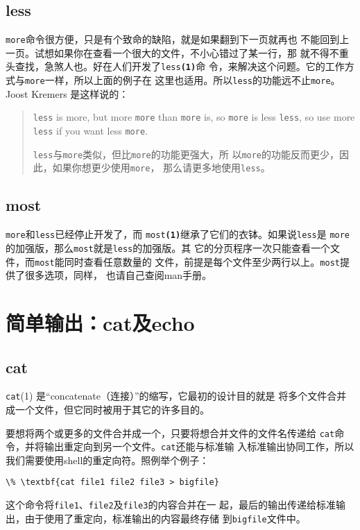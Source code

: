 \subsection{less}
\label{sec:handlingFilesAndDirectories:pagers:less}
\texttt{more}命令很方便，只是有个致命的缺陷，就是如果翻到下一页就再也
不能回到上一页。试想如果你在查看一个很大的文件，不小心错过了某一行，那
就不得不重头查找，急煞人也。好在人们开发了\texttt{less\textbf{(1)}}命
令，来解决这个问题。它的工作方式与\texttt{more}一样，所以上面的例子在
这里也适用。所以\texttt{less}的功能远不止\texttt{more}。Joost Kremers
是这样说的：
\begin{quote}
  \texttt{less} is more, but more \texttt{more} than \texttt{more} is,
  so \texttt{more} is less \texttt{less}, so use more \texttt{less} if
  you want less \texttt{more}.

  \texttt{less}与\texttt{more}类似，但比\texttt{more}的功能更强大，所
  以\texttt{more}的功能反而更少，因此，如果你想更少使用\texttt{more}，
  那么请更多地使用\texttt{less}。
\end{quote}

\subsection{most}
\label{sec:handlingFilesAndDirectories:pagers:most}
\texttt{more}和\texttt{less}已经停止开发了，而
\texttt{most\textbf{(1)}}继承了它们的衣钵。如果说\texttt{less}是
\texttt{more}的加强版，那么\texttt{most}就是\texttt{less}的加强版。其
它的分页程序一次只能查看一个文件，而\texttt{most}能同时查看任意数量的
文件，前提是每个文件至少两行以上。\texttt{most}提供了很多选项，同样，
也请自己查阅man手册。

\section{简单输出：cat及echo}
\label{sec:handlingFilesAndDirectories:simpleOutput}

\subsection{cat}
\label{sec:handlingFilesAndDirectories:simpleOutput:cat}
\texttt{cat}(1) 是``concatenate（连接）''的缩写，它最初的设计目的就是
将多个文件合并成一个文件，但它同时被用于其它的许多目的。

要想将两个或更多的文件合并成一个，只要将想合并文件的文件名传递给
\texttt{cat}命令，并将输出重定向到另一个文件。\texttt{cat}还能与标准输
入标准输出协同工作，所以我们需要使用shell的重定向符。照例举个例子：
\begin{Verbatim}[frame=single, commandchars=\\\{\}]
\% \textbf{cat file1 file2 file3 > bigfile}
\end{Verbatim}
这个命令将\texttt{file1}、\texttt{file2}及\texttt{file3}的内容合并在一
起，最后的输出传递给标准输出，由于使用了重定向，标准输出的内容最终存储
到\texttt{bigfile}文件中。

